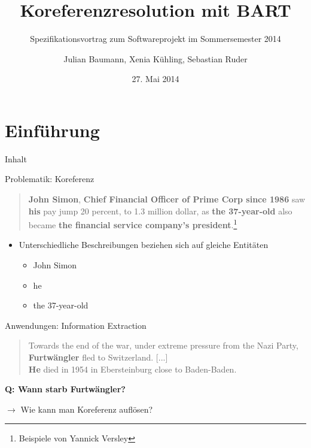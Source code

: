 \documentclass[11pt,a4paper]{beamer}
\author{Julian Baumann, Xenia Kühling, Sebastian Ruder}
\title{Koreferenzresolution mit BART}
\subtitle{Spezifikationsvortrag zum Softwareprojekt im Sommersemester 2014}
\date{27. Mai 2014}
\begin{document}
\maketitle

\section{Einführung}
\begin{frame}{Inhalt}
\tableofcontents
\end{frame}

\begin{frame}{Problematik: Koreferenz}
\begin{quote}

\textbf{John Simon}, \textbf{Chief Financial Officer of Prime Corp since 1986} saw \textbf{his} pay jump 20 percent, to 1.3 million dollar, as \textbf{the 37-year-old} also became \textbf{the financial service company’s president}.\footnote{Beispiele von Yannick Versley}
\end{quote}
\bigskip
\begin{itemize}
\item Unterschiedliche Beschreibungen beziehen sich auf gleiche Entitäten
\begin{itemize}
\item John Simon
\item he
\item the 37-year-old
\end{itemize}
\end{itemize}
\end{frame} 

\begin{frame}{Anwendungen: Information Extraction}
\begin{quote}


Towards the end of the war, under extreme pressure from the Nazi
Party, \textbf{Furtwängler} fled to Switzerland. [...]\\
\textbf{He} died in 1954 in Ebersteinburg close to Baden-Baden.
\end{quote}
\bigskip

\textbf{Q: Wann starb Furtwängler?}
\bigskip

$\rightarrow$ Wie kann man Koreferenz auflösen?




\end{frame}
\end{document}
